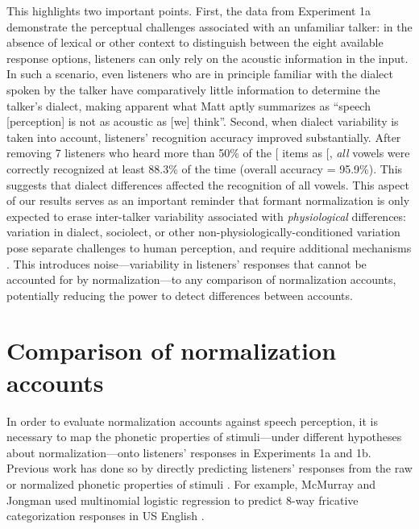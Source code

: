 \documentclass[preprint]{JASA}
\begin{document}
This highlights two important points. First, the data from Experiment 1a demonstrate the perceptual challenges associated with an unfamiliar talker: in the absence of lexical or other context to distinguish between the eight available response options, listeners can only rely on the acoustic information in the input. In such a scenario, even listeners who are in principle familiar with the dialect spoken by the talker have comparatively little information to determine the talker's dialect, making apparent what Matt \citet{winn2018} aptly summarizes as ``speech {[}perception{]} is not as acoustic as {[}we{]} think''. Second, when dialect variability is taken into account, listeners' recognition accuracy improved substantially. After removing 7 listeners who heard more than 50\% of the {[}\ipatext{ɪ}{]} items as {[}\ipatext{ɛ}{]}, \emph{all} vowels were correctly recognized at least 88.3\% of the time (overall accuracy = 95.9\%). This suggests that dialect differences affected the recognition of all vowels. This aspect of our results serves as an important reminder that formant normalization is only expected to erase inter-talker variability associated with \emph{physiological} differences: variation in dialect, sociolect, or other non-physiologically-conditioned variation pose separate challenges to human perception, and require additional mechanisms \citep[see discussion in][]{barreda2021, weatherholtz-jaeger2016}. This introduces noise---variability in listeners' responses that cannot be accounted for by normalization---to any comparison of normalization accounts, potentially reducing the power to detect differences between accounts.

\section{Comparison of normalization accounts}\label{comparison-of-normalization-accounts}

In order to evaluate normalization accounts against speech perception, it is necessary to map the phonetic properties of stimuli---under different hypotheses about normalization---onto listeners' responses in Experiments 1a and 1b. Previous work has done so by directly predicting listeners' responses from the raw or normalized phonetic properties of stimuli \citep{apfelbaum-mcmurray2015, barreda2021, crinnion2020, mcmurray-jongman2011, nearey1989}. For example, McMurray and Jongman used multinomial logistic regression to predict 8-way fricative categorization responses in US English \citep[see also][]{barreda2021}.
\end{document}
